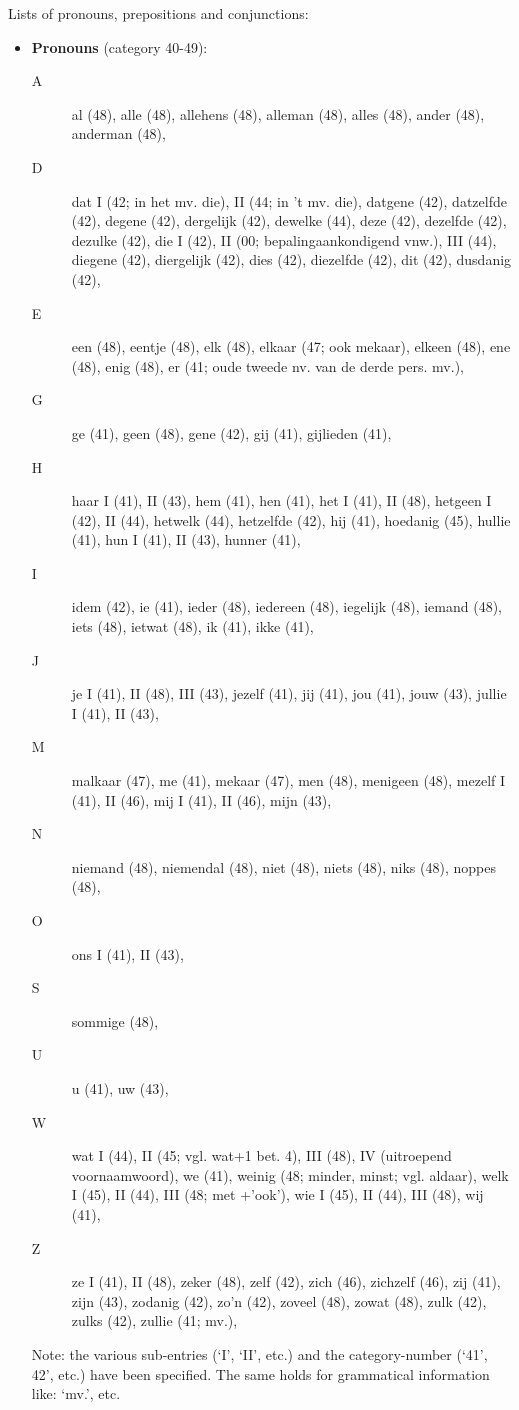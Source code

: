 Lists of pronouns, prepositions and conjunctions:
\begin{itemize}
  \item {\bf Pronouns} (category 40-49):
  \begin{description}
      \item [A] al (48), alle (48), allehens (48), alleman (48), alles (48), 
                ander (48), anderman (48),
      \item [D] dat I (42; in het mv. die), II (44; in 't mv. die), 
                datgene (42),
                datzelfde (42), degene (42), dergelijk (42), 
                dewelke (44), deze (42),
                dezelfde (42), dezulke (42), die I (42), II 
                (00; bepalingaankondigend vnw.), III (44), diegene (42), 
                diergelijk (42), dies (42), diezelfde (42), dit (42),
                dusdanig (42),
      \item [E] een (48), eentje (48), elk (48), elkaar (47; ook mekaar), 
                elkeen (48), ene (48), enig (48), 
                er (41; oude tweede nv. van de derde pers. mv.),
      \item [G] ge (41), geen (48), gene (42), gij (41), gijlieden (41),
      \item [H] haar I (41), II (43), hem (41), hen (41), het I (41), II (48), 
                hetgeen I (42), II (44), hetwelk (44), hetzelfde (42), hij (41),
                hoedanig (45), hullie (41), hun I (41), II (43), hunner (41),
      \item [I] idem (42), ie (41), ieder (48), iedereen (48), iegelijk (48), 
                iemand (48), iets (48), ietwat (48), ik (41), ikke (41),
      \item [J] je I (41), II (48), III (43), jezelf (41), jij (41), jou (41),
                jouw (43), jullie I (41), II (43),
      \item [M] malkaar (47), me (41), mekaar (47), men (48), menigeen (48), 
                mezelf I (41), II (46), mij I (41), II (46), mijn (43),
      \item [N] niemand (48), niemendal (48), niet (48), niets (48), niks (48),
                noppes (48),
      \item [O] ons I (41), II (43),
      \item [S] sommige (48),
      \item [U] u (41), uw (43),
      \item [W] wat I (44), II (45; vgl. wat+1 bet. 4), III (48), 
                IV (uitroepend voornaamwoord), we (41), weinig 
                (48; minder, minst; vgl. aldaar), welk I (45), II (44), 
                III (48; met +'ook'), wie I (45), II (44), III (48), wij (41),
      \item [Z] ze I (41), II (48), zeker (48), zelf (42), zich (46), 
                zichzelf (46), zij (41), zijn (43), zodanig (42), zo'n (42), 
                zoveel (48), zowat (48), zulk (42), zulks (42), zullie 
                (41; mv.),
      \end{description}
   Note: the various sub-entries (`I', `II', etc.) and the category-number
   (`41', 42', etc.) have been specified. The same holds for grammatical 
   information like: `mv.', etc.


\end{itemize}
